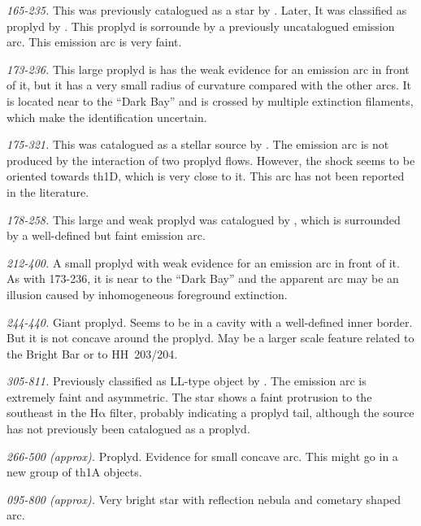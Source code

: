\documentclass[apj, twocolumn]{aastex63}
\newcommand\ha{\ensuremath{\mathrm{H\alpha}}}
\begin{document}
\textit{165-235.} This was previously catalogued as a star
by \citet{ODell:1996a}. Later, It was classified as proplyd
by \citet{Ricci:2008a}. This proplyd is sorrounde by a
previously uncatalogued emission arc. This emission arc is
very faint.

\textit{173-236.} This large proplyd is has the weak evidence for an
emission arc in front of it, but it has a very small radius of
curvature compared with the other arcs.  It is located near to the
``Dark Bay'' \citep{ODell:2000a} and is crossed by multiple extinction
filaments, which make the identification uncertain.

\textit{175-321.} This was catalogued as a stellar source by \citet{ODell:1996a}.
The emission arc is not produced by the interaction of two proplyd flows. However,
the shock seems to be oriented towards th1D, which is very close to it. This arc
has not been reported in the literature.

\textit{178-258.}  This large and weak proplyd was catalogued
by \citet{Ricci:2008a}, which is surrounded by a well-defined
but faint emission arc.

\textit{212-400.}  A small proplyd with weak evidence for an emission
arc in front of it.  As with 173-236, it is near to the ``Dark Bay''
and the apparent arc may be an illusion caused by inhomogeneous
foreground extinction.

\textit{244-440.} Giant proplyd.  Seems to be in a cavity with a
well-defined inner border.  But it is not concave around the proplyd.
May be a larger scale feature related to the Bright Bar or to
HH~203/204.

\textit{305-811.} Previously classified as LL-type object
by \citet{Bally:2006a}. The emission arc is extremely faint
and asymmetric. The star shows  a faint protrusion to the
southeast in the \ha{} filter, probably indicating a proplyd
tail, although the source has not previously been catalogued as
a proplyd.  

\textit{266-500 (approx).} Proplyd. Evidence for small concave arc.
This might go in a new group of th1A objects.

\textit{095-800 (approx).} Very bright star with reflection nebula
and cometary shaped arc. 

\label{sec:problematic-group}




\label{sec:notshell}
\end{document}
